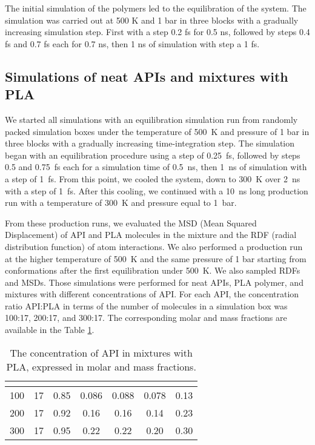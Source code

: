 The initial simulation of the polymers led to the equilibration of the system. The simulation was carried out at 500 K and 1 bar in three blocks with a gradually increasing simulation step. First with a step 0.2 fs for 0.5 ns, followed by steps 0.4 fs and 0.7 fs each for 0.7 ns, then 1 ns of simulation with step a 1 fs. 





\subsection{Simulations of neat APIs and mixtures with PLA}
We started all simulations with an equilibration simulation run from randomly packed simulation boxes under the temperature of 500~K and pressure of 1 bar in three blocks with a gradually increasing time-integration step. The simulation began with an equilibration procedure using a step of 0.25~fs, followed by steps 0.5 and 0.75~fs each for a simulation time of 0.5~ns, then 1~ns of simulation with a step of 1~fs. From this point, we cooled the system, down to 300~K over 2~ns with a step of 1~fs. After this cooling, we continued with a 10~ns long production run with a temperature of 300~K and pressure equal to 1~bar.

From these production runs, we evaluated the MSD (Mean Squared Displacement) of API and PLA molecules in the mixture and the RDF (radial distribution function) of atom interactions. We also performed a production run at the higher temperature of 500~K and the same pressure of 1 bar starting from conformations after the first equilibration under 500~K. We also sampled RDFs and MSDs. Those simulations were performed for neat APIs, PLA polymer, and mixtures with different concentrations of API. For each API, the concentration ratio API:PLA in terms of the number of molecules in a simulation box was 100:17, 200:17, and 300:17. The corresponding molar and mass fractions are available in the Table \ref{tab:fractions}.

\begin{table}[h]
	\centering
	\caption{The concentration of API in mixtures with PLA, expressed in molar and mass fractions.}
	\begin{tabular}{ccccccc}
		\toprule
		{\textbf{\boldmath{$N_{\text{API}}$}}} &
		{\textbf{\boldmath{$N_{\text{PLA}}$}}} &
		{\textbf{\boldmath{$x_{\text{API}}$}}} & {\textbf{\boldmath{$w_{\text{nap}}$}}} & {\textbf{\boldmath{$w_{\text{cbz}}$}}} & {\textbf{\boldmath{$w_{\text{ibu}}$}}} & {\textbf{\boldmath{$w_{\text{indo}}$}}} \\
		\midrule
		100 & 17 & 0.85 & 0.086 & 0.088 & 0.078 & 0.13 \\
		200 & 17 & 0.92 & 0.16 & 0.16 & 0.14 & 0.23 \\
		300 & 17 & 0.95 & 0.22 & 0.22 & 0.20 & 0.30 \\
		\bottomrule
	\end{tabular}
	\label{tab:fractions}
\end{table} 

